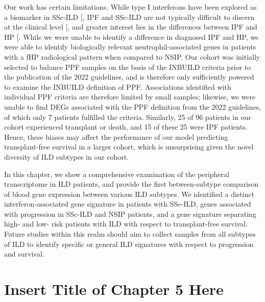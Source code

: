 \documentclass[
]{article}
\begin{document}
Our work has certain limitations. While type I interferons have been explored as a biomarker in SSc-ILD {[}\citeproc{ref-kakkar_type_2022}{146}{]}, IPF and SSc-ILD are not typically difficult to discern at the clinical level {[}\citeproc{ref-herzog_interstitial_2014}{147}{]}, and greater interest lies in the differences between IPF and HP {[}\citeproc{ref-raghu_diagnosis_2020}{150}{]}. While we were unable to identify a difference in diagnosed IPF and HP, we were able to identify biologically relevant neutrophil-associated genes in patients with a fHP radiological pattern when compared to NSIP. Our cohort was initially selected to balance PPF samples on the basis of the INBUILD criteria prior to the publication of the 2022 guidelines, and is therefore only sufficiently powered to examine the INBUILD definition of PPF. Associations identified with individual PPF criteria are therefore limited by small samples; likewise, we were unable to find DEGs associated with the PPF definition from the 2022 guidelines, of which only 7 patients fulfilled the criteria. Similarly, 25 of 96 patients in our cohort experienced transplant or death, and 15 of these 25 were IPF patients. Hence, these biases may affect the performance of our model predicting transplant-free survival in a larger cohort, which is unsurprising given the novel diversity of ILD subtypes in our cohort.

In this chapter, we show a comprehensive examination of the peripheral transcriptome in ILD patients, and provide the first between-subtype comparison of blood gene expression between various ILD subtypes. We identified a distinct interferon-associated gene signature in patients with SSc-ILD, genes associated with progression in SSc-ILD and NSIP patients, and a gene signature separating high- and low- risk patients with ILD with respect to transplant-free survival. Future studies within this realm should aim to collect samples from all subtypes of ILD to identify specific or general ILD signatures with respect to progression and survival.

\clearpage

\section{Insert Title of Chapter 5 Here}\label{insert-title-of-chapter-5-here}

\renewcommand{\thefigure}{5.\arabic{figure}}
\setcounter{figure}{0}
\renewcommand{\thetable}{5.\arabic{table}}
\setcounter{table}{0}
\renewcommand{\theequation}{5.\arabic{equation}}
\setcounter{equation}{0}
\end{document}
